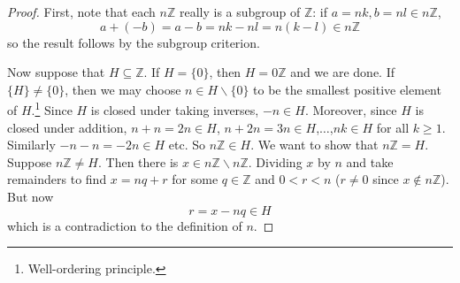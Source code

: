 \documentclass[10pt, a4paper, twoside]{report}
\begin{document}
\begin{proof}
    First, note that each \(n\mathbb{Z}\) really is a subgroup of \(\mathbb{Z}\): if \(a=nk, b=nl\in n\mathbb{Z}\),
    \[a+(-b)=a-b=nk-nl=n(k-l)\in n\mathbb{Z}\]
    so the result follows by the subgroup criterion.

    Now suppose that \(H\subseteq\mathbb{Z}\). If \(H=\{0\}\), then \(H=0\mathbb{Z}\) and we are done. If \(\{H\}\neq\{0\}\), then we may choose \(n\in H\backslash\{0\}\) to be the smallest positive element of \(H\).\footnote{Well-ordering principle.} Since \(H\) is closed under taking inverses, \(-n\in H\). Moreover, since \(H\) is closed under addition, \(n+n=2n\in H\), \(n+2n=3n\in H\),\(\ldots\),\(nk\in H\) for all \(k\geq 1\). Similarly \(-n-n=-2n\in H\) etc. So \(n\mathbb{Z}\in H\). We want to show that \(n\mathbb{Z}=H\). Suppose \(n\mathbb{Z}\neq H\). Then there is \(x\in n\mathbb{Z}\backslash n\mathbb{Z}\). Dividing \(x\) by \(n\) and take remainders to find \(x=nq+r\) for some \(q\in\mathbb{Z}\) and \(0<r<n\) (\(r\neq 0\) since \(x\notin n\mathbb{Z}\)). But now 
    \[r=x-nq\in H\]
    which is a contradiction to the definition of \(n\).
\end{proof}
\end{document}
